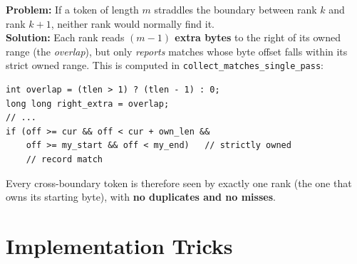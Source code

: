 \documentclass[11pt,a4paper]{article}
\begin{document}
\vspace{0.25cm}

\begin{tcolorbox}[challenge={Challenge 3 — Token split across two rank boundaries}]
\textbf{Problem:} If a token of length $m$ straddles the boundary between rank $k$ and rank $k{+}1$, neither rank would normally find it.\\
\textbf{Solution:} Each rank reads \textbf{$(m-1)$ extra bytes} to the right of its owned range (the \emph{overlap}), but only \emph{reports} matches whose byte offset falls within its strict owned range. This is computed in \texttt{collect\_matches\_single\_pass}:
\begin{lstlisting}[style=cstyle]
int overlap = (tlen > 1) ? (tlen - 1) : 0;
long long right_extra = overlap;
// ...
if (off >= cur && off < cur + own_len &&
    off >= my_start && off < my_end)   // strictly owned
    // record match
\end{lstlisting}
Every cross-boundary token is therefore seen by exactly one rank (the one that owns its starting byte), with \textbf{no duplicates and no misses}.
\end{tcolorbox}

\newpage
\section{Implementation Tricks}
\end{document}
